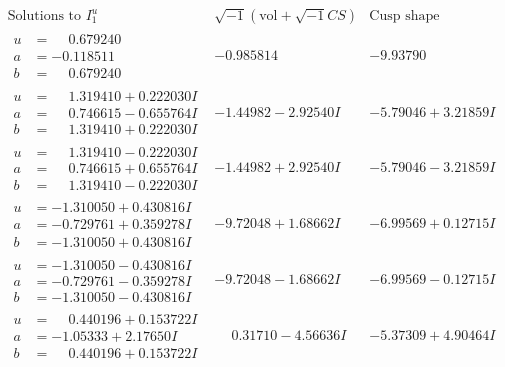 \documentclass[1p]{elsarticle_modified}
\theoremstyle{definition}
\newcommand{\I}{\sqrt{-1}}
\begin{document}
$$\begin{array}{c|c|c}  
\text{Solutions to }I^u_{1}& \I (\text{vol} + \sqrt{-1}CS) & \text{Cusp shape}\\
 \hline 
\begin{aligned}
u &= \phantom{-}0.679240\phantom{ +0.000000I} \\
a &= -0.118511\phantom{ +0.000000I} \\
b &= \phantom{-}0.679240\phantom{ +0.000000I}\end{aligned}
 & -0.985814\phantom{ +0.000000I} & -9.93790\phantom{ +0.000000I} \\ \hline\begin{aligned}
u &= \phantom{-}1.319410 + 0.222030 I \\
a &= \phantom{-}0.746615 - 0.655764 I \\
b &= \phantom{-}1.319410 + 0.222030 I\end{aligned}
 & -1.44982 - 2.92540 I & -5.79046 + 3.21859 I \\ \hline\begin{aligned}
u &= \phantom{-}1.319410 - 0.222030 I \\
a &= \phantom{-}0.746615 + 0.655764 I \\
b &= \phantom{-}1.319410 - 0.222030 I\end{aligned}
 & -1.44982 + 2.92540 I & -5.79046 - 3.21859 I \\ \hline\begin{aligned}
u &= -1.310050 + 0.430816 I \\
a &= -0.729761 + 0.359278 I \\
b &= -1.310050 + 0.430816 I\end{aligned}
 & -9.72048 + 1.68662 I & -6.99569 + 0.12715 I \\ \hline\begin{aligned}
u &= -1.310050 - 0.430816 I \\
a &= -0.729761 - 0.359278 I \\
b &= -1.310050 - 0.430816 I\end{aligned}
 & -9.72048 - 1.68662 I & -6.99569 - 0.12715 I \\ \hline\begin{aligned}
u &= \phantom{-}0.440196 + 0.153722 I \\
a &= -1.05333 + 2.17650 I \\
b &= \phantom{-}0.440196 + 0.153722 I\end{aligned}
 & \phantom{-}0.31710 - 4.56636 I & -5.37309 + 4.90464 I \\ \hline\begin{aligned}

\end{aligned}
\end{array}$$
\end{document}

